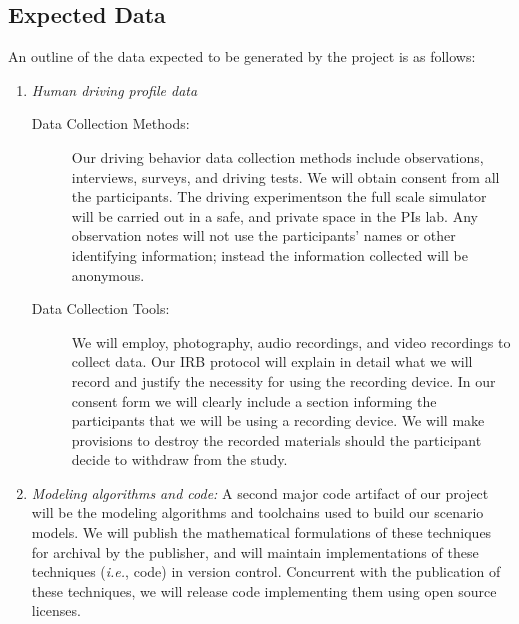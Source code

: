 \subsection*{Expected Data}
An outline of the data expected to be generated by the project is as follows:
\begin{enumerate}
 \item {\em Human driving profile data}
    \begin{description}
    
    \item[Data Collection Methods: ] Our driving behavior data collection methods include observations, interviews, surveys, and driving tests. We will obtain consent from all the participants. The driving experimentson the full scale simulator will be carried out in a safe, and private space in the PIs lab. Any observation notes will not use the participants’ names or other identifying information; instead the information collected will be anonymous.
    
    \item[Data Collection Tools: ] We will employ, photography, audio recordings, and video recordings to collect data. Our IRB protocol will explain in detail what we will record and justify the necessity for using the recording device. In our consent form we will clearly include a section informing the participants that we will be using a recording device. We will make provisions to destroy the recorded materials should the participant decide to withdraw from the study.
    
    \end{description}

 \item {\em Modeling algorithms and code:}
A second major code artifact of our project will be the modeling algorithms and toolchains used to build our scenario models. We will publish the mathematical formulations of these techniques for archival by the publisher, and will maintain implementations of these techniques ({\em i.e.}, code) in version control. Concurrent with the publication of these techniques, we will release code implementing them using open source licenses.
 
\end{enumerate}

